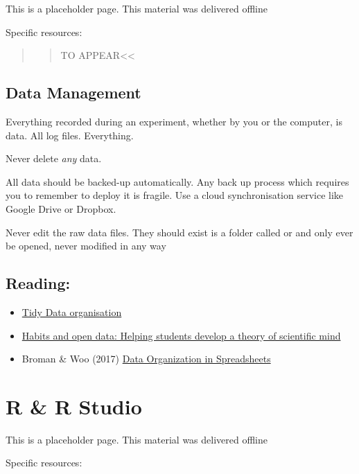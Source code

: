 \documentclass[]{book}
\providecommand{\tightlist}{%
  \setlength{\itemsep}{0pt}\setlength{\parskip}{0pt}}
\begin{document}
This is a placeholder page. This material was delivered offline

Specific resources:

\begin{quote}
\begin{quote}
TO APPEAR\textless{}\textless{}
\end{quote}
\end{quote}

\section{Data Management}\label{data-management}

Everything recorded during an experiment, whether by you or the
computer, is data. All log files. Everything.

Never delete \emph{any} data.

All data should be backed-up automatically. Any back up process which
requires you to remember to deploy it is fragile. Use a cloud
synchronisation service like Google Drive or Dropbox.

Never edit the raw data files. They should exist is a folder called
\raw or \data and only ever be opened, never modified in any way

\section{Reading:}\label{reading}

\begin{itemize}
\tightlist
\item
  \href{http://vita.had.co.nz/papers/tidy-data.pdf}{Tidy Data
  organisation}
\item
  \href{http://bayesfactor.blogspot.co.uk/2015/11/habits-and-open-data-helping-students.html}{Habits
  and open data: Helping students develop a theory of scientific mind}
\item
  Broman \& Woo (2017)
  \href{https://www.tandfonline.com/doi/full/10.1080/00031305.2017.1375989}{Data
  Organization in Spreadsheets}
\end{itemize}

\chapter{R \& R Studio}\label{r-r-studio}

This is a placeholder page. This material was delivered offline

Specific resources:
\end{document}
